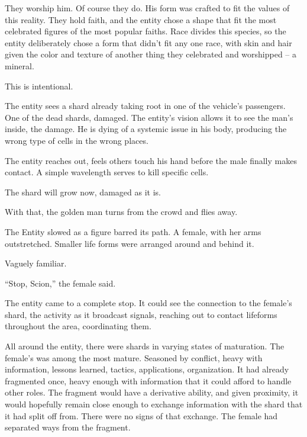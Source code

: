 They worship him.  Of course they do.  His form was crafted to fit the values of this reality.  They hold faith, and the entity chose a shape that fit the most celebrated figures of the most popular faiths.  Race divides this species, so the entity deliberately chose a form that didn't fit any one race, with skin and hair given the color and texture of another thing they celebrated and worshipped – a mineral.



This is intentional.



The entity sees a shard already taking root in one of the vehicle's passengers.  One of the dead shards, damaged.  The entity's vision allows it to see the man's inside, the damage.  He is dying of a systemic issue in his body, producing the wrong type of cells in the wrong places.



The entity reaches out, feels others touch his hand before the male finally makes contact.  A simple wavelength serves to kill specific cells.



The shard will grow now, damaged as it is.



With that, the golden man turns from the crowd and flies away.



\blacksquare



The Entity slowed as a figure barred its path.  A female, with her arms outstretched.  Smaller life forms were arranged around and behind it.



Vaguely familiar.



``Stop, Scion,'' the female said.



The entity came to a complete stop.  It could see the connection to the female's shard, the activity as it broadcast signals, reaching out to contact lifeforms throughout the area, coordinating them.



All around the entity, there were shards in varying states of maturation.  The female's was among the most mature.  Seasoned by conflict, heavy with information, lessons learned, tactics, applications, organization.  It had already fragmented once, heavy enough with information that it could afford to handle other roles.  The fragment would have a derivative ability, and given proximity, it would hopefully remain close enough to exchange information with the shard that it had split off from.  There were no signs of that exchange.  The female had separated ways from the fragment.



